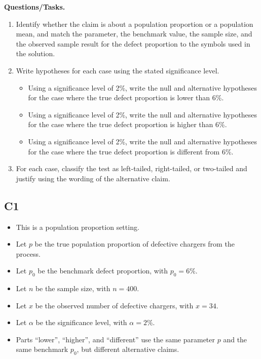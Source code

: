 		\textbf{Questions/Tasks.}
		\begin{enumerate}
			\item[(C1)] Identify whether the claim is about a population proportion or a population mean, and match the parameter, the benchmark value, the sample size, and the observed sample result for the defect proportion to the symbols used in the solution.
			\item[(C2)] Write hypotheses for each case using the stated significance level.
			\begin{itemize}
				\item[(a)] Using a significance level of 2\%, write the null and alternative hypotheses for the case where the true defect proportion is lower than 6\%.
				\item[(b)] Using a significance level of 2\%, write the null and alternative hypotheses for the case where the true defect proportion is higher than 6\%.
				\item[(c)] Using a significance level of 2\%, write the null and alternative hypotheses for the case where the true defect proportion is different from 6\%.
			\end{itemize}
			\item[(C3)] For each case, classify the test as left-tailed, right-tailed, or two-tailed and justify using the wording of the alternative claim.
		\end{enumerate}
		
		\subsection*{C1}
		\begin{itemize}
			\item This is a population proportion setting.
			\item Let \(p\) be the true population proportion of defective chargers from the process.
			\item Let \(p_0\) be the benchmark defect proportion, with \(p_0=6\%\).
			\item Let \(n\) be the sample size, with \(n=400\).
			\item Let \(x\) be the observed number of defective chargers, with \(x=34\).
			\item Let \(\alpha\) be the significance level, with \(\alpha=2\%\).
			\item Parts ``lower'', ``higher'', and ``different'' use the same parameter \(p\) and the same benchmark \(p_0\), but different alternative claims.
		\end{itemize}
		
